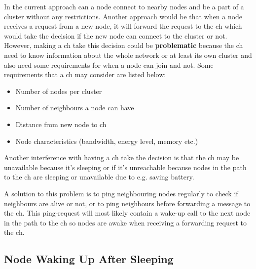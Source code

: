 \documentclass[USenglish]{uit-thesis}
\begin{document}

In the current approach can a node connect to nearby nodes and be a part of a cluster without any restrictions. Another approach would be that when a node receives a request from a new node, it will forward the request to the \gls{ch} which would take the decision if the new node can connect to the cluster or not. However, making a \gls{ch} take this decision could be \textbf{problematic} because the \gls{ch} need to know information about the whole network or at least its own cluster and also need some requirements for when a node can join and not. Some requirements that a \gls{ch} may consider are listed below:

\begin{itemize}
\item Number of nodes per cluster
\item Number of neighbours a node can have
\item Distance from new node to \gls{ch}
\item Node characteristics (bandwidth, energy level, memory etc.)
\end{itemize}

Another interference with having a \gls{ch} take the decision is that the \gls{ch} may be unavailable because it's sleeping or if it's unreachable because nodes in the path to the \gls{ch} are sleeping or unavailable due to e.g. saving battery. 


A solution to this problem is to ping neighbouring nodes regularly to check if neighbours are alive or not, or to ping neighbours before forwarding a message to the \gls{ch}. This ping-request will most likely contain a wake-up call to the next node in the path to the \gls{ch} so nodes are awake when receiving a forwarding request to the \gls{ch}.





\subsection{Node Waking Up After Sleeping}
\end{document}
